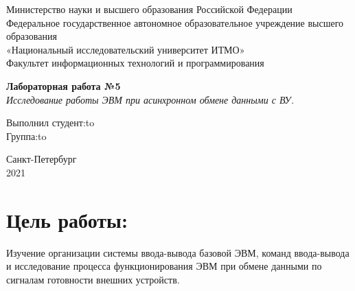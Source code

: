 \documentclass[a4paper,14pt]{article}
\begin{document}
\begin{titlepage}
\newpage

\begin{center}
Министерство науки и высшего образования Российской Федерации\\
Федеральное государственное автономное образовательное учреждение высшего образования\\
«Национальный исследовательский университет ИТМО»\\
Факультет информационных технологий и программирования\\
\end{center}

\vspace{\fill}

\begin{center}
\textbf{Лабораторная работа №5}\\
\textit{Исследование работы ЭВМ при асинхронном обмене данными с ВУ.}
\end{center}

\vspace{\fill}

\newbox{\lbox}
\newlength{\maxl}
\setlength{\maxl}{\wd\lbox}
\hfill\parbox{14cm}{
\hspace*{5cm}Выполнил студент:\hfill\hbox to\\
\hspace*{5cm}Группа:\hfill\hbox to\\
}


\vspace{8em}

\begin{center}
Санкт-Петербург \\2021
\end{center}

\end{titlepage}


\section*{Цель работы:}
Изучение организации системы ввода-вывода базовой ЭВМ, команд ввода-вывода и исследование процесса функционирования ЭВМ при обмене данными по сигналам готовности внешних устройств.
\end{document}
